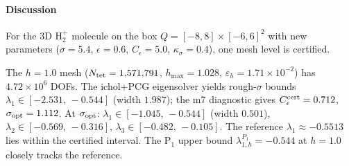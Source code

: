\documentclass[11pt]{article}
\theoremstyle{plain}
\theoremstyle{definition}
\theoremstyle{remark}
\begin{document}
\begin{table}[htbp]
\caption{3D $\mathrm{H}_2^+$ ($V=-1/|x-a_1|-1/|x-a_2|$,
$a_{1,2}=(\mp 2,0,0)$, $d=4\,\mathrm{bohr}$) on $Q=[-8,8]\times[-6,6]^2$,
Neumann BC (CECR lower bounds) / Dirichlet BC ($\mathrm{P}_1$ upper bounds),
linearly-graded Delaunay mesh with optimal-patch radius,
$\sigma=5.4$, $\epsilon=0.6$, $C_\epsilon=5.0$, $\kappa_\sigma=0.4$, $C_6=0.619$:
shifted Ritz value $\mu_{k,h}^\sigma{-}\sigma$,
intermediate lower bound $L_k^{\mu,\sigma}$,
certified lower bound $L_k=(1-\varepsilon_h)(L_k^{\mu,\sigma}{+}\sigma)-\sigma$
using $\varepsilon_h=d_h^{\rm opt}/\kappa_\sigma$,
$\mathrm{P}_1$ Galerkin upper bound $\lambda_{k,h}^{P_1}$,
and optimal-$\sigma$ bound $L_k^{\rm opt}$,
for $k=1,2,3$.
$h=1.0$: ichol+PCG (4.72M DOFs), $\sigma_{\rm opt}=1.112$ ($C_\epsilon^{\rm cert}=0.712$).
Reference: $\lambda_1\approx -0.5513$ (Bates~1953).}
\label{tab:twocenter-3d-cecr}
\centering
\footnotesize
\setlength{\tabcolsep}{2pt}
\end{table}

\paragraph{Discussion}
For the 3D H$_2^+$ molecule on the box $Q=[-8,8]\times[-6,6]^2$
with new parameters ($\sigma=5.4$, $\epsilon=0.6$, $C_\epsilon=5.0$, $\kappa_\sigma=0.4$),
one mesh level is certified.

The $h=1.0$ mesh ($N_{\rm tet}=1{,}571{,}791$, $h_{\max}=1.028$,
$\varepsilon_h=1.71\times10^{-2}$) has $4.72\times10^6$ DOFs.
The ichol+PCG eigensolver yields rough-$\sigma$ bounds
$\lambda_1\in[-2.531,\,-0.544]$ (width $1.987$);
the m7 diagnostic gives $C_\epsilon^{\rm cert}=0.712$,
$\sigma_{\rm opt}=1.112$.
At $\sigma_{\rm opt}$: $\lambda_1\in[-1.045,\,-0.544]$ (width $0.501$),
$\lambda_2\in[-0.569,\,-0.316]$, $\lambda_3\in[-0.482,\,-0.105]$.
The reference $\lambda_1\approx-0.5513$ lies within the certified interval.
The $\mathrm{P}_1$ upper bound $\lambda_{1,h}^{P_1}=-0.544$ at $h=1.0$
closely tracks the reference.
\end{document}
